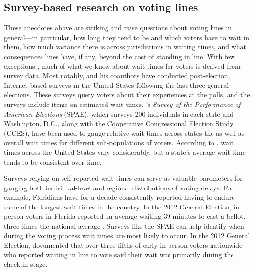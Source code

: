 \documentclass[12pt,titlepage]{article}
\begin{document}
\subsection*{Survey-based research on voting lines}

These anecdotes above are striking and raise questions about voting
lines in general---in particular, how long they tend to be and which
voters have to wait in them, how much variance there is across
jurisdictions in waiting times, and what consequences lines have, if
any, beyond the cost of standing in line.  With few exceptions
\citep[e.g.,][]{spencermarkovits:renege, herronsmith:hanoverstudy,
  pettigrew:longlinesminorityprecincts}, much of what we know about
wait times for voters is derived from survey data. Most notably,
\citet{stewart:waitingtovote2012} and his coauthors have conducted
post-election, Internet-based surveys in the United States following
the last three general elections.  These surveys query voters about
their experiences at the polls, and the surveys include items on
estimated wait times.  \citeauthor{stewart:waitingtovote2012}'s
\emph{Survey of the Performance of American Elections} (SPAE), which
surveys 200 individuals in each state and Washington, D.C., along with
the Cooperative Congressional Election Study (CCES), have been used to
gauge relative wait times across states the as well as overall wait
times for different sub-populations of voters.  According to
\citeauthor{stewart:waitingtovote2012}, wait times across the United
States vary considerably, but a state's average wait time tends to be
consistent over time.

Surveys relying on self-reported wait times can serve as valuable
barometers for gauging both individual-level and regional
distributions of voting delays.  For example, Floridians have for a
decade consistently reported having to endure some of the longest wait
times in the country. In the 2012 General Election, in-person voters
in Florida reported on average waiting 39 minutes to cast a ballot,
three times the national average \citep{stewart:waitingtovote2012}.
Surveys like the SPAE can help identify when during the voting process
wait times are most likely to occur.  In the 2012 General Election,
\citeauthor{stewart:waitingtovote2012} documented that over
three-fifths of early in-person voters nationwide who reported waiting
in line to vote said their wait was primarily during the check-in
stage.
\end{document}
